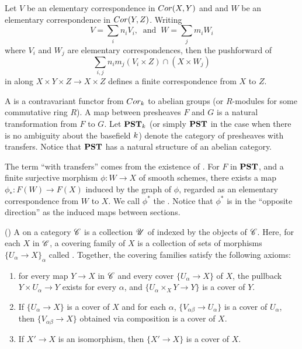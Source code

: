 \begin{lem}\label{lem_cor_composition}
Let $V$ be an elementary correspondence in $Cor(X, Y)$
and and $W$ be an elementary correspondence in $Cor(Y, Z)$. 
Writing
\[
V = \sum_i n_i V_i, \;\;\textrm{and}\;\; W = \sum_j m_i W_i
\]
where $V_i$ and $W_j$ are elementary correspondences, then
the pushforward of
\[
\sum_{i, j} n_im_j (V_i \times Z) \cap (X \times W_j)
\]
in along $X \times Y \times Z \to X \times Z$ defines a finite 
correspondence from $X$ to $Z$.
\end{lem}

\begin{defn}\label{def_pst}
A  is a contravariant functor from 
$Cor_k$ to abelian groups (or $R$-modules for some commutative 
ring $R$). A map between presheaves $F$ and $G$ is a natural 
transformation from $F$ to $G$. Let $\mathbf{PST}_{k}$ (or simply 
$\mathbf{PST}$ in the case when there is no ambiguity about the basefield 
$k$) denote the category of presheaves with transfers. 
Notice that $\mathbf{PST}$ has a natural structure of an abelian category.
\end{defn}

\begin{rmk}
The term ``with transfers'' comes from the existence of 
. For $F$ in $\mathbf{PST}$, and a finite surjective
morphism $\phi : W \to X$ of smooth schemes, there exists a
map $\phi_*: F(W) \to F(X)$ induced by the graph of $\phi$,
regarded as an elementary correspondence from $W$ to $X$.
We call $\phi^*$ the . Notice that $\phi^*$
is in the ``opposite direction'' as the induced maps between
sections.
\end{rmk}

\begin{defn}\label{def_groth_top} (\cite[II.1.3]{SGA4})
A  on a category $\mathscr{C}$ is a
collection $\mathscr{U}$ of  indexed by the objects
of $\mathscr{C}$. Here, for each $X$ in $\mathscr{C}$, a covering family of
$X$ is a collection of sets of morphisms $\{U_\alpha \to X\}_\alpha$
called . Together, the covering families satisfy
the following axioms:

\begin{enumerate}
\item for every map $Y \to X$ in $\mathscr{C}$ and every cover 
$\{U_\alpha \to X\}$ of $X$, the pullback $Y \times U_\alpha \to 
Y$ exists for every $\alpha$, and $\{U_\alpha \times_X Y \to Y\}$ 
is a cover of $Y$.

\item If $\{U_\alpha \to X\}$ is a cover of $X$ and for each 
$\alpha$, $\{V_{\alpha\beta} \to U_\alpha\}$ is a cover of 
$U_\alpha$, then $\{V_{\alpha\beta} \to X\}$ obtained via 
composition is a cover of $X$.

\item If $X' \to X$ is an isomorphism, then $\{X' \to X\}$ is a 
cover of $X$.
\end{enumerate}
\end{defn}

